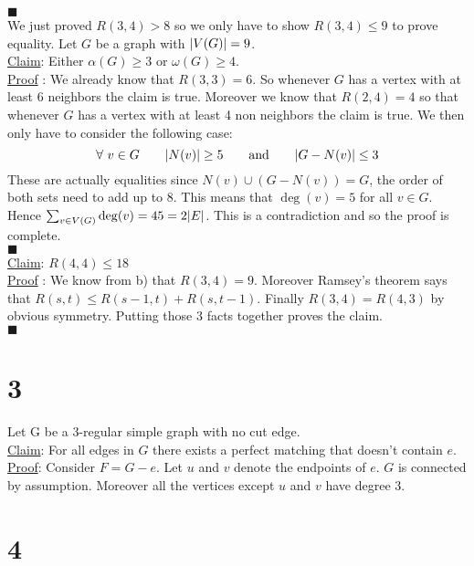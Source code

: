 \documentclass{article}
\DeclarePairedDelimiter{\abs}{\lvert}{\rvert}
\begin{document}
	$\blacksquare$ \\
	\clearpage
	We just proved $R(3,4) > 8$ so we only have to show $R(3,4) \leq 9$ to prove equality. Let $G$ be a graph with $\abs{V(G)} = 9$. \\
	\underline{Claim}: Either $\alpha(G) \geq 3$ or $\omega(G) \geq 4$.\\
	\underline{Proof} : We already know that $R(3,3) = 6$. So whenever $G$ has a vertex with at least 6 neighbors the claim is true. Moreover we know that $R(2,4) = 4$ so that whenever $G$ has a vertex with at least 4 non neighbors the claim is true. We then only have to consider the following case: 
	\begin{equation}
		\forall \ v  \in G  \qquad 
		\abs{N(v)} \geq 5 \qquad \text{and} \qquad \abs{G-N(v)} \leq 3
	\end{equation}  
	These are actually equalities since $N(v) \cup (G - N(v)) = G$, the order of both sets need to add up to 8. This means that $\deg (v) = 5$ for all $v\in G$. Hence $\sum_{v\in V(G)} \deg(v) = 45 = 2 \abs E $. This is a contradiction and so the proof is complete.\\
	$\blacksquare$ \\[2ex]
	\underline{Claim}: $R(4,4) \leq 18$\\
	\underline{Proof} : We know from b) that $R(3,4) = 9$. Moreover Ramsey's theorem says that $R(s,t) \leq R(s-1,t) + R(s,t-1)$. Finally $R(3,4) = R(4,3)$ by obvious symmetry. Putting those 3 facts together proves the claim.\\
	$\blacksquare$
	
	\clearpage
	
	\section*{3}
	Let G be a 3-regular simple graph with no cut edge. \\
	\underline{Claim}: For all edges in $G$ there exists a perfect matching that doesn't contain $e$.\\
	\underline{Proof}: Consider $F = G - e$. Let $u$ and $v$ denote the endpoints of $e$. $G$ is connected by assumption. Moreover all the vertices except $u$ and $v$ have degree 3. 
	
	\clearpage
	\section*{4}
	
\end{document}
